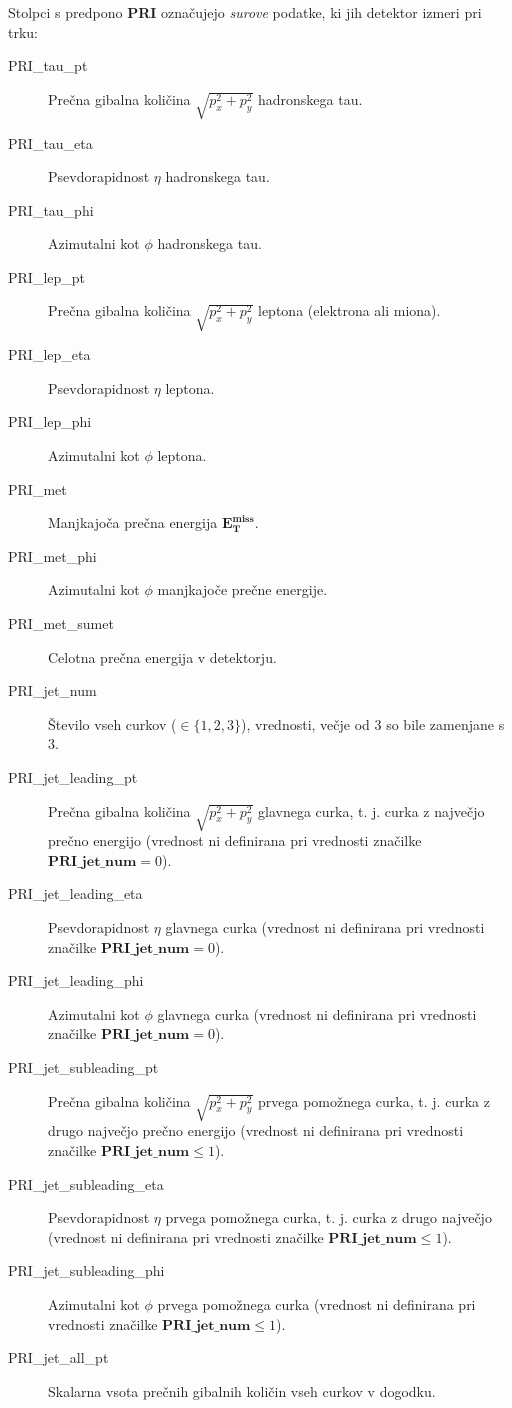 \documentclass[11pt,a4paper,openany]{book}
\begin{document}
Stolpci s predpono \textbf{PRI} označujejo \textit{surove} podatke, ki jih detektor izmeri pri trku:
\begin{changemargin}{0.5cm}{0.0cm} 
\begin{description}
	\item[PRI\_tau\_pt] Prečna gibalna količina $\sqrt{p_x^2 + p_y^2}$ hadronskega tau.
	\item[PRI\_tau\_eta] Psevdorapidnost $\eta$ hadronskega tau.
	\item[PRI\_tau\_phi] Azimutalni kot $\phi$ hadronskega tau.
	
	\item[PRI\_lep\_pt] Prečna gibalna količina $\sqrt{p_x^2 + p_y^2}$ leptona (elektrona ali miona).
	\item[PRI\_lep\_eta] Psevdorapidnost $\eta$ leptona.
	\item[PRI\_lep\_phi] Azimutalni kot $\phi$ leptona.
	
	\item[PRI\_met] Manjkajoča prečna energija $\mathbf{E_T^{\text{miss}}}$.
	\item[PRI\_met\_phi] Azimutalni kot $\phi$ manjkajoče prečne energije.
	
	\item[PRI\_met\_sumet] Celotna prečna energija v detektorju.
	
	\item[PRI\_jet\_num] Število vseh curkov ($\in \{1, 2, 3\}$), vrednosti, večje od $3$ so bile zamenjane s 3.
	
	\item[PRI\_jet\_leading\_pt] Prečna gibalna količina $\sqrt{p_x^2 + p_y^2}$ glavnega curka, t. j. curka z največjo prečno energijo (vrednost ni definirana pri vrednosti značilke $\textbf{PRI\_jet\_num} = 0$).
	\item[PRI\_jet\_leading\_eta] Psevdorapidnost $\eta$ glavnega curka (vrednost ni definirana pri vrednosti značilke $\textbf{PRI\_jet\_num} = 0$).
	\item[PRI\_jet\_leading\_phi] Azimutalni kot $\phi$ glavnega curka (vrednost ni definirana pri vrednosti značilke $\textbf{PRI\_jet\_num} = 0$).
	
	\item[PRI\_jet\_subleading\_pt] Prečna gibalna količina $\sqrt{p_x^2 + p_y^2}$ prvega pomožnega curka, t. j. curka z drugo največjo prečno energijo (vrednost ni definirana pri vrednosti značilke $\textbf{PRI\_jet\_num} \le 1$).
	\item[PRI\_jet\_subleading\_eta] Psevdorapidnost $\eta$ prvega pomožnega curka, t. j. curka z drugo največjo (vrednost ni definirana pri vrednosti značilke $\textbf{PRI\_jet\_num} \le 1$).
	\item[PRI\_jet\_subleading\_phi] Azimutalni kot $\phi$ prvega pomožnega curka (vrednost ni definirana pri vrednosti značilke $\textbf{PRI\_jet\_num} \le 1$).
	
	\item[PRI\_jet\_all\_pt] Skalarna vsota prečnih gibalnih količin vseh curkov v dogodku.
\end{description}
\end{changemargin}
\end{document}

